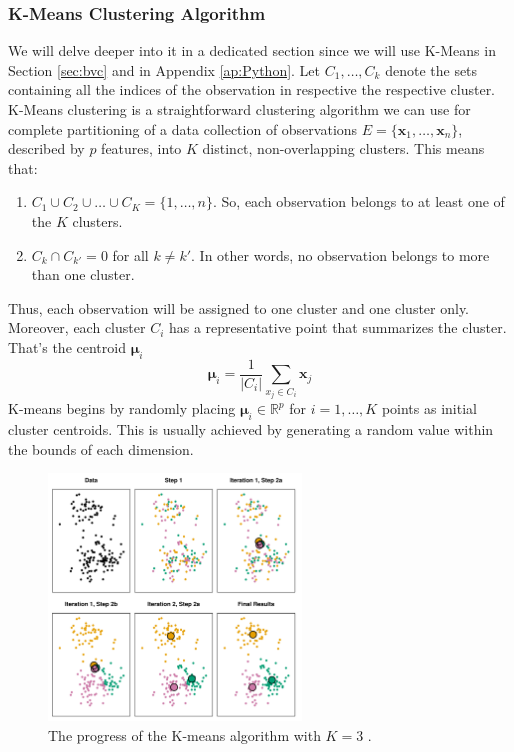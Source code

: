 \subsubsection{K-Means Clustering Algorithm}
\label{sss:kmeans}
We will delve deeper into it in a dedicated section since we will use K-Means in Section \ref{sec:bvc} and in Appendix \ref{ap:Python}. Let $C_1,\dots,C_k$ denote the sets containing all the indices of the observation in respective the respective cluster. K-Means clustering is a straightforward clustering algorithm we can use for complete partitioning of a data collection of observations $E=\{\mathbf{x}_1, \dots, \mathbf{x}_n \}$, described by $p$ features, into $K$ distinct, non-overlapping clusters. This means that:
\begin{enumerate}
    \item $C_1 \cup C_2 \cup \dots \cup C_K=\{1,\dots,n\}$. So, each observation belongs to at least one of the $K$ clusters.
    \item $C_k\cap C_{k'}=0$ for all $k\neq k'$. In other words, no observation belongs to more than one cluster.
\end{enumerate}
Thus, each observation will be assigned to one cluster and one cluster only. Moreover, each cluster $C_i$ has a representative point that summarizes the cluster. That's the centroid $\bm{\mu}_i$
\begin{equation}
    \label{eq:centroid}
    \boldsymbol{\mu}_i=\frac{1}{\left|C_i\right|} \sum_{x_j \in C_i} \mathbf{x}_j
\end{equation}
K-means begins by randomly placing $\bm{\mu}_i \in \mathbb{R}^p$ for $i=1,\dots,K$ points as initial cluster centroids. This is usually achieved by generating a random value within the bounds of each dimension. 
\begin{figure}
    \centering
    \includegraphics[width=0.6\textwidth]{Images/clustiteration.png}
    \caption[K-Means clustering iterations.]{The progress of the K-means algorithm with $K=3$ \cite{james_introduction_2021}.}
    \label{fig:clustiteration}
\end{figure}
